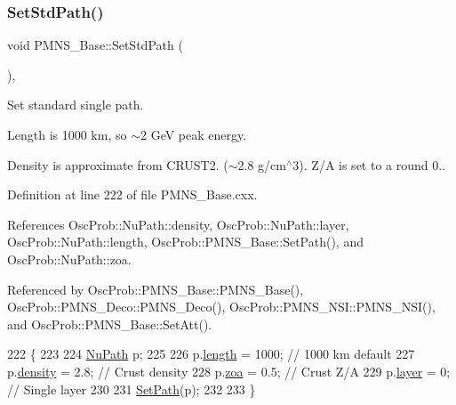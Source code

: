 \subsubsection{\texorpdfstring{Set\+Std\+Path()}{SetStdPath()}}
{\footnotesize\ttfamily void P\+M\+N\+S\+\_\+\+Base\+::\+Set\+Std\+Path (\begin{DoxyParamCaption}{ }\end{DoxyParamCaption})\hspace{0.3cm}{\ttfamily [virtual]}, {\ttfamily [inherited]}}

Set standard single path.

Length is 1000 km, so $\sim$2 GeV peak energy.

Density is approximate from C\+R\+U\+S\+T2. ($\sim$2.8 g/cm$^\wedge$3). Z/A is set to a round 0.. 

Definition at line 222 of file P\+M\+N\+S\+\_\+\+Base.\+cxx.



References Osc\+Prob\+::\+Nu\+Path\+::density, Osc\+Prob\+::\+Nu\+Path\+::layer, Osc\+Prob\+::\+Nu\+Path\+::length, Osc\+Prob\+::\+P\+M\+N\+S\+\_\+\+Base\+::\+Set\+Path(), and Osc\+Prob\+::\+Nu\+Path\+::zoa.



Referenced by Osc\+Prob\+::\+P\+M\+N\+S\+\_\+\+Base\+::\+P\+M\+N\+S\+\_\+\+Base(), Osc\+Prob\+::\+P\+M\+N\+S\+\_\+\+Deco\+::\+P\+M\+N\+S\+\_\+\+Deco(), Osc\+Prob\+::\+P\+M\+N\+S\+\_\+\+N\+S\+I\+::\+P\+M\+N\+S\+\_\+\+N\+S\+I(), and Osc\+Prob\+::\+P\+M\+N\+S\+\_\+\+Base\+::\+Set\+Att().


\begin{DoxyCode}
222                           \{
223 
224   \hyperlink{structOscProb_1_1NuPath}{NuPath} p;
225 
226   p.\hyperlink{structOscProb_1_1NuPath_af22660894b6e25cf835500381b155557}{length}  = 1000; \textcolor{comment}{// 1000 km default}
227   p.\hyperlink{structOscProb_1_1NuPath_a54ddd451db69bc54434de3cf18a117ca}{density} = 2.8;  \textcolor{comment}{// Crust density}
228   p.\hyperlink{structOscProb_1_1NuPath_af3213f3691ba83c6bc05f4a3490f6b31}{zoa}     = 0.5;  \textcolor{comment}{// Crust Z/A}
229   p.\hyperlink{structOscProb_1_1NuPath_a442b160899e554ad1d800989510d5309}{layer}   = 0;    \textcolor{comment}{// Single layer}
230 
231   \hyperlink{classOscProb_1_1PMNS__Base_ac3b644fd0a56347d304ceca4ae9d8875}{SetPath}(p);
232 
233 \}
\end{DoxyCode}
\mbox{\label{classOscProb_1_1PMNS__Base_aa94c1e1fff0ba731c75f7e633b023a9f}} 
